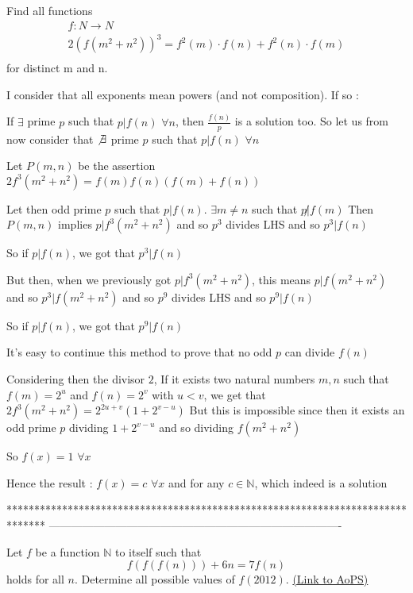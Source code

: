 \begin{solution}
	\begin{tcolorbox}Find all functions 
\[
\begin{array}{l}
 f:N \to N \\ 
 2(f(m^2  + n^2 ))^3  = f^2 (m) \cdot f(n) + f^2 (n) \cdot f(m) \\ 
 \end{array}
\] for distinct m and n.\end{tcolorbox}
I consider that all exponents mean powers (and not composition). If so :


If $\exists $ prime $p$ such that $p|f(n)$ $\forall n$, then $\frac{f(n)}p$ is a solution too.
So let us from now consider that $\not\exists$ prime $p$ such that $p|f(n)$ $\forall n$

Let $P(m,n)$ be the assertion $2f^3(m^2+n^2)=f(m)f(n)\left(f(m)+f(n)\right)$

Let then odd prime $p$ such that $p|f(n)$. $\exists m\ne n$ such that $p\not|f(m)$ 
Then $P(m,n)$ implies $p|f^3(m^2+n^2)$ and so $p^3$ divides LHS and so $p^3|f(n)$

So if $p|f(n)$, we got that $p^3|f(n)$

But then, when we previously got $p|f^3(m^2+n^2)$, this means $p|f(m^2+n^2)$ and so $p^3|f(m^2+n^2)$ and so $p^9$ divides LHS and so $p^9|f(n)$

So if $p|f(n)$, we got that $p^9|f(n)$

It's easy to continue this method to prove that no odd $p$ can divide $f(n)$

Considering then the divisor $2$, If it exists two natural numbers $m,n$ such that $f(m)=2^u$ and $f(n)=2^v$ with $u<v$, we get that $2f^3(m^2+n^2)=2^{2u+v}(1+2^{v-u})$
But this is impossible since then it exists an odd prime $p$ dividing $1+2^{v-u}$ and so dividing $f(m^2+n^2)$

So $f(x)=1$ $\forall x$

Hence the result : $\boxed{f(x)=c}$ $\forall x$ and for any $c\in\mathbb N$, which indeed is a solution
\end{solution}
*******************************************************************************
-------------------------------------------------------------------------------

\begin{problem}
	Let $f$ be a function $\mathbb{N}$ to itself such that 
\[f(f(f(n)))+6n=7f(n)\]
holds for all $n$. Determine all possible values of $f(2012)$.
	\flushright \href{https://artofproblemsolving.com/community/c6h465544}{(Link to AoPS)}
\end{problem}




